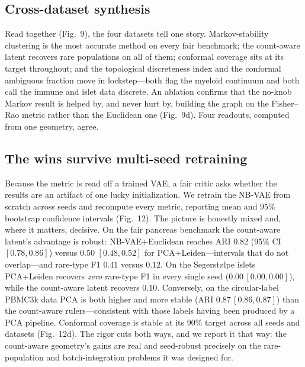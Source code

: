 \documentclass[11pt]{article}
\newcommand{\msnbari}{0.82}     %
\newcommand{\mspcaarims}{0.50}  %
\newcommand{\msnbrare}{0.41}    %
\newcommand{\mspcararems}{0.12} %
\newcommand{\mssegnb}{0.10}     %
\begin{document}
\subsection{Cross-dataset synthesis}
Read together (Fig.~9), the four datasets tell one story. Markov-stability clustering is the most
accurate method on every fair benchmark; the count-aware latent recovers rare populations on all of
them; conformal coverage sits at its target throughout; and the topological discreteness index and
the conformal ambiguous fraction move in lockstep---both flag the myeloid continuum and both call
the immune and islet data discrete. An ablation confirms that the no-knob Markov result is helped by,
and never hurt by, building the graph on the Fisher--Rao metric rather than the Euclidean one
(Fig.~9d). Four readouts, computed from one geometry, agree.

\subsection{The wins survive multi-seed retraining}
Because the metric is read off a trained VAE, a fair critic asks whether the results are an artifact of
one lucky initialization. We retrain the NB-VAE from scratch across seeds and recompute every metric,
reporting mean and $95\%$ bootstrap confidence intervals (Fig.~12). The picture is honestly mixed and,
where it matters, decisive. On the fair pancreas benchmark the count-aware latent's advantage is
robust: NB-VAE+Euclidean reaches ARI $\msnbari$ (95\% CI $[0.78,0.86]$) versus $\mspcaarims$
$[0.48,0.52]$ for PCA+Leiden---intervals that do not overlap---and rare-type F1 $\msnbrare$ versus
$\mspcararems$. On the Segerst{\o}lpe islets PCA+Leiden recovers \emph{zero} rare-type F1 in every
single seed ($0.00\,[0.00,0.00]$), while the count-aware latent recovers $\mssegnb$. Conversely, on the
circular-label PBMC3k data PCA is both higher and more stable (ARI $0.87\,[0.86,0.87]$) than the
count-aware rulers---consistent with those labels having been produced by a PCA pipeline. Conformal
coverage is stable at its $90\%$ target across all seeds and datasets (Fig.~12d). The rigor cuts both
ways, and we report it that way: the count-aware geometry's gains are real and seed-robust precisely on
the rare-population and batch-integration problems it was designed for.
\end{document}
